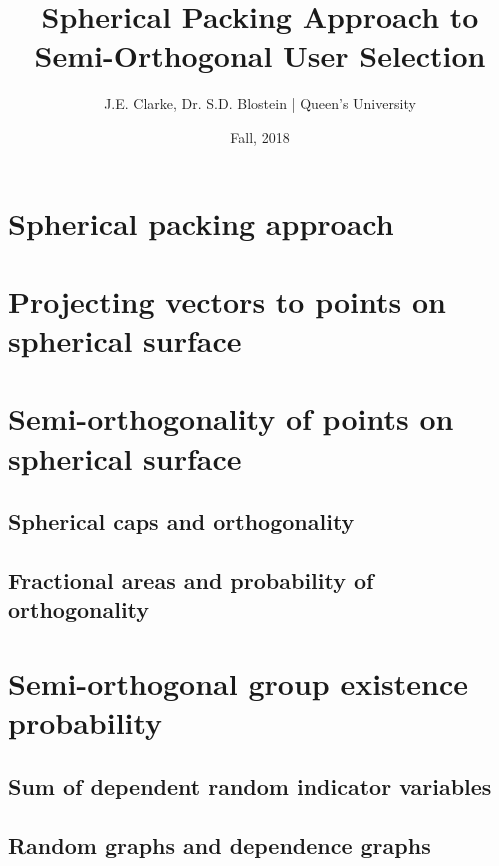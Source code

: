 \documentclass[11pt]{article}
\title{Spherical Packing Approach to Semi-Orthogonal User Selection}
\author{J.E. Clarke, Dr. S.D. Blostein | Queen's University}
\date{Fall, 2018}
\begin{document}
	\maketitle
	\newpage
    \section{Spherical packing approach}
        
        
    \section{Projecting vectors to points on spherical surface}\label{sec:chan_norm}
        
    \section{Semi-orthogonality of points on spherical surface}\label{sec:spherical_caps}
        \subsection{Spherical caps and orthogonality}
            
        \subsection{Fractional areas and probability of orthogonality}
            
    \section{Semi-orthogonal group existence probability}
        \subsection{Sum of dependent random indicator variables}
            
        \subsection{Random graphs and dependence graphs}
            
    

    \newpage

    \newpage	
 	\begingroup
 		\renewcommand{\section}[2]{}%
 		
 		
 	\endgroup
\end{document}
